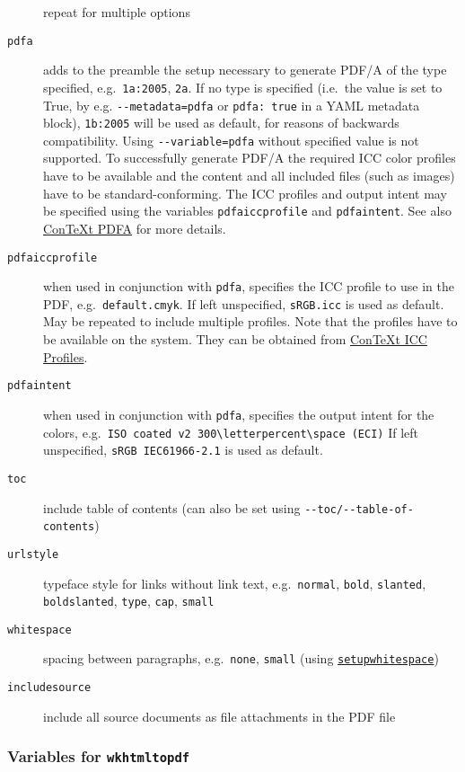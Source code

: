 \documentclass[
  a4paper,
]{article}
\begin{document}
\begin{description}
repeat for multiple options
\item[\texttt{pdfa}]
adds to the preamble the setup necessary to generate PDF/A of the type
specified, e.g.~\texttt{1a:2005}, \texttt{2a}. If no type is specified
(i.e.~the value is set to True, by e.g. \texttt{-\/-metadata=pdfa} or
\texttt{pdfa:\ true} in a YAML metadata block), \texttt{1b:2005} will be
used as default, for reasons of backwards compatibility. Using
\texttt{-\/-variable=pdfa} without specified value is not supported. To
successfully generate PDF/A the required ICC color profiles have to be
available and the content and all included files (such as images) have
to be standard-conforming. The ICC profiles and output intent may be
specified using the variables \texttt{pdfaiccprofile} and
\texttt{pdfaintent}. See also
\href{https://wiki.contextgarden.net/PDF/A}{ConTeXt PDFA} for more
details.
\item[\texttt{pdfaiccprofile}]
when used in conjunction with \texttt{pdfa}, specifies the ICC profile
to use in the PDF, e.g.~\texttt{default.cmyk}. If left unspecified,
\texttt{sRGB.icc} is used as default. May be repeated to include
multiple profiles. Note that the profiles have to be available on the
system. They can be obtained from
\href{https://wiki.contextgarden.net/PDFX\#ICC_profiles}{ConTeXt ICC
Profiles}.
\item[\texttt{pdfaintent}]
when used in conjunction with \texttt{pdfa}, specifies the output intent
for the colors,
e.g.~\texttt{ISO\ coated\ v2\ 300\textbackslash{}letterpercent\textbackslash{}space\ (ECI)}
If left unspecified, \texttt{sRGB\ IEC61966-2.1} is used as default.
\item[\texttt{toc}]
include table of contents (can also be set using
\texttt{-\/-toc/-\/-table-of-contents})
\item[\texttt{urlstyle}]
typeface style for links without link text, e.g.~\texttt{normal},
\texttt{bold}, \texttt{slanted}, \texttt{boldslanted}, \texttt{type},
\texttt{cap}, \texttt{small}
\item[\texttt{whitespace}]
spacing between paragraphs, e.g.~\texttt{none}, \texttt{small} (using
\href{https://wiki.contextgarden.net/Command/setupwhitespace}{\texttt{setupwhitespace}})
\item[\texttt{includesource}]
include all source documents as file attachments in the PDF file
\end{description}

\hypertarget{variables-for-wkhtmltopdf}{%
\subsubsection{\texorpdfstring{Variables for
\texttt{wkhtmltopdf}}{Variables for wkhtmltopdf}}\label{variables-for-wkhtmltopdf}}
\end{document}

